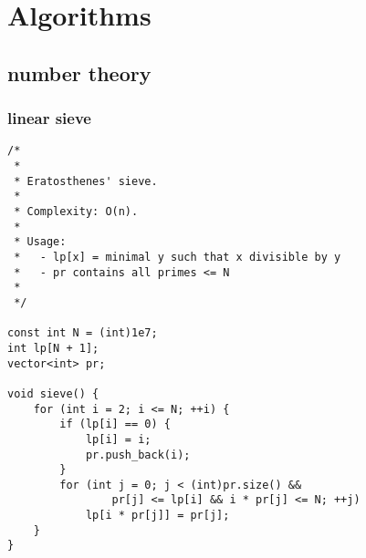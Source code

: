 \section{Algorithms}

\subsection{number theory}
\subsubsection{linear sieve}
\begin{lstlisting}
/*
 *
 * Eratosthenes' sieve.
 *
 * Complexity: O(n).
 *
 * Usage:
 *   - lp[x] = minimal y such that x divisible by y
 *   - pr contains all primes <= N
 *
 */

const int N = (int)1e7;
int lp[N + 1];
vector<int> pr;
 
void sieve() {
    for (int i = 2; i <= N; ++i) {
        if (lp[i] == 0) {
            lp[i] = i;
            pr.push_back(i);
        }
        for (int j = 0; j < (int)pr.size() &&
                pr[j] <= lp[i] && i * pr[j] <= N; ++j)
            lp[i * pr[j]] = pr[j];
    }
}
\end{lstlisting}
